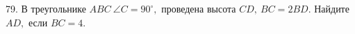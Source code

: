 79. В треугольнике $ABC\ \angle C=90^\circ,$ проведена высота $CD,\ BC=2BD.$ Найдите $AD,$ если $BC=4.$\\
